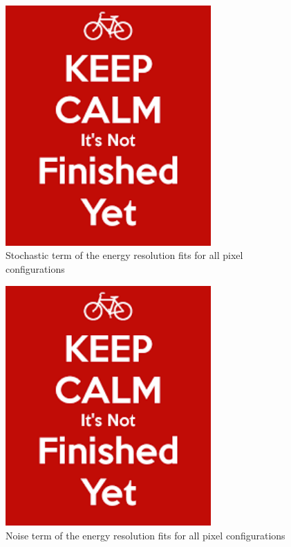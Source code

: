 \begin{figure}
  \centering
  \includegraphics[width=0.7\textwidth,keepaspectratio]{DECALStudies/fig/dummy}
  \caption{Stochastic term of the energy resolution fits for all pixel configurations}
  \label{fig:stochasticterm}
\end{figure}
\begin{figure}
  \centering
  \includegraphics[width=0.7\textwidth,keepaspectratio]{DECALStudies/fig/dummy}
  \caption{Noise term of the energy resolution fits for all pixel configurations}
  \label{fig:noiseterm}
\end{figure}
